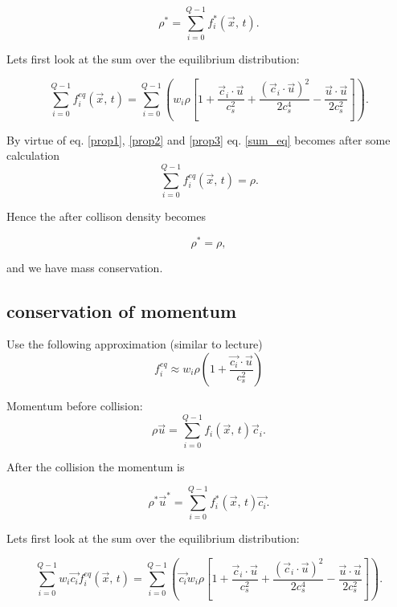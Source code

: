 \begin{equation}
    \rho^* = \sum_{i=0}^{Q-1} f_i^*(\vec{x}, \, t).
\end{equation}


Lets first look at the sum over the equilibrium distribution:

\begin{equation}
    \sum_{i=0}^{Q-1} f_i^{eq}(\vec{x}, \, t) =  \sum_{i=0}^{Q-1} \left( 
     w_i\rho \left[ 1 + 
    \frac{ \vec{c}_i \cdot \vec{u} }{c_s^2} + 
    \frac{(\vec{c}_i \cdot \vec{u})^2}{2c_s^4} -
    \frac{\vec{u}\cdot\vec{u}}{2c_s^2}
    \right]
    \right).
\label{sum_eq}
\end{equation}

By virtue of eq. \ref{prop1}, \ref{prop2} and \ref{prop3} eq. \ref{sum_eq} becomes after some calculation
\begin{equation}
    \sum_{i=0}^{Q-1} f_i^{eq}(\vec{x}, \, t) =  \rho.
\end{equation}

Hence the after collison density becomes

\begin{equation}
    \rho^* = \rho,
\end{equation}

and we have mass conservation.

\subsection{conservation of momentum}

Use the following approximation (similar to lecture)
\begin{equation}
	f_i^{eq} \approx w_i\rho \left ( 1 + \frac{\vec{c_i}\cdot\vec{u}}{c_s^2} \right )
\end{equation}

Momentum before collision:
\begin{equation}
\rho\vec{u} = \sum_{i=0}^{Q-1} f_i(\vec{x}, \, t)\vec{c}_i .
\end{equation}

After the collision the momentum is

\begin{equation}
    \rho^*\vec{u}^* = \sum_{i=0}^{Q-1} f_i^*(\vec{x}, \, t)\vec{c_i}.
\end{equation}


Lets first look at the sum over the equilibrium distribution:

\begin{equation}
    \sum_{i=0}^{Q-1} w_i\vec{c_i}f_i^{eq}(\vec{x}, \, t) =  \sum_{i=0}^{Q-1} \left( 
     \vec{c_i}w_i\rho \left[ 1 + 
    \frac{ \vec{c}_i \cdot \vec{u} }{c_s^2} + 
    \frac{(\vec{c}_i \cdot \vec{u})^2}{2c_s^4} -
    \frac{\vec{u}\cdot\vec{u}}{2c_s^2}
    \right]
    \right).
\label{sum_eq_mom}
\end{equation}

